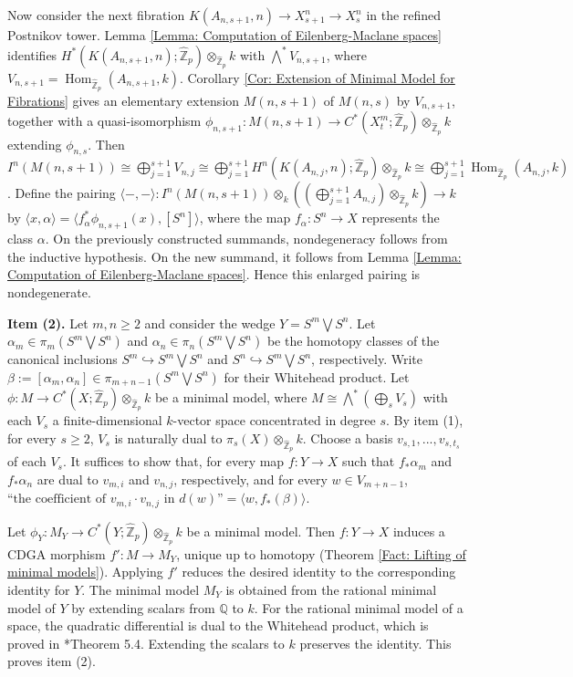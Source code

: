 \documentclass[11pt]{amsart}
\theoremstyle{definition}
\numberwithin{equation}{section}
\numberwithin{equation}{section}
\newcommand\QQ{\mathbb{Q}}
\newcommand\ZZ{\mathbb{Z}}
\DeclareMathOperator{\homo}{Hom}
\begin{document}
Now consider the next fibration $K(A_{n,s+1},n)\rightarrow X^n_{s+1}\rightarrow X^{n}_{s}$ in the refined Postnikov tower. Lemma \ref{Lemma: Computation of Eilenberg-Maclane spaces} identifies $H^*(K(A_{n,s+1},n);\widehat{\ZZ}_p)\otimes_{\widehat{\ZZ}_p} k$ with $ \bigwedge^*V_{n,s+1}$, where $V_{n,s+1}=\homo_{\widehat{\ZZ}_p}(A_{n,s+1},k)$. Corollary \ref{Cor: Extension of Minimal Model for Fibrations} gives an elementary extension $M(n,s+1)$ of $M(n,s)$ by $V_{n,s+1}$, together with a quasi-isomorphism $\phi_{n,s+1}:M(n,s+1)\rightarrow C^*(X^m_t;\widehat{\ZZ}_p)\otimes_{\widehat{\ZZ}_p} k$ extending $\phi_{n,s}$. Then $I^{n}(M(n,s+1))\cong\bigoplus_{j=1}^{s+1} V_{n,j}\cong\bigoplus_{j=1}^{s+1} H^{n}(K(A_{n,j},n);\widehat{\ZZ}_p)\otimes_{\widehat{\ZZ}_p} k\cong \bigoplus_{j=1}^{s+1}\homo_{\widehat{\ZZ}_p}(A_{n,j}, k)$. Define the pairing 
$
\langle -,- \rangle: I^{n}(M(n,s+1))\otimes_{k} ((\bigoplus_{j=1}^{s+1}A_{n,j})\otimes_{\widehat{\ZZ}_p} k)\rightarrow k
$
by $\langle x,\alpha \rangle=\langle f_{\alpha}^*\phi_{n,s+1}(x),[S^{n}]\rangle$, where the map $f_{\alpha}:S^n\rightarrow X$ represents the class $\alpha$. On the previously constructed summands, nondegeneracy follows from the inductive hypothesis. On the new summand, it follows from Lemma \ref{Lemma: Computation of Eilenberg-Maclane spaces}. Hence this enlarged pairing is nondegenerate.

\textbf{Item (2).} Let $m,n\geq 2$ and consider the wedge $Y=S^{m}\bigvee S^n$. Let $\alpha_m\in \pi_m(S^{m}\bigvee S^n)$ and $\alpha_n\in \pi_n(S^{m}\bigvee S^n)$ be the homotopy classes of the canonical inclusions $S^m\hookrightarrow S^{m}\bigvee S^n$ and $S^n\hookrightarrow S^{m}\bigvee S^n$, respectively. Write $\beta:=[\alpha_m,\alpha_n] \in \pi_{m+n-1}(S^{m}\bigvee S^n)$ for their Whitehead product. Let $\phi:M\rightarrow C^*(X;\widehat{\ZZ}_p)\otimes_{\widehat{\ZZ}_p} k$ be a minimal model, where $M\cong \bigwedge^* (\bigoplus_s V_s)$ with each $V_s$ a finite-dimensional $k$-vector space concentrated in degree $s$. By item (1), for every $s\geq 2$, $V_s$ is naturally dual to $\pi_s(X)\otimes_{\widehat{\ZZ}_p} k$. Choose a basis $v_{s,1},...,v_{s,t_s}$ of each $V_s$. It suffices to show that, for every map $f:Y\rightarrow X$ such that $f_*\alpha_m$ and $f_*\alpha_n$ are dual to $v_{m,i}$ and  $v_{n,j}$, respectively, and for every $w\in V_{m+n-1}$, $\text{``the coefficient of $v_{m,i}\cdot v_{n,j}$ in $d(w)$''}=\langle w, f_*(\beta)\rangle$.

Let $\phi_Y:M_Y\rightarrow C^*(Y;\widehat{\ZZ}_p)\otimes_{\widehat{\ZZ}_p} k$ be a minimal model. Then $f:Y\rightarrow X$ induces a CDGA morphism $f':M\rightarrow M_Y$, unique up to homotopy (Theorem \ref{Fact: Lifting of minimal models}). Applying $f'$ reduces the desired identity to the corresponding identity for $Y$. The minimal model $M_Y$ is obtained from the rational minimal model of $Y$ by extending scalars from $\QQ$ to $k$. For the rational minimal model of a space, the quadratic differential is dual to the Whitehead product, which is proved in \cite{Andrews-Arkowitz-minimal-model-Whitehead-product}*{Theorem 5.4}. Extending the scalars to $k$ preserves the identity. This proves item (2).
\end{document}
